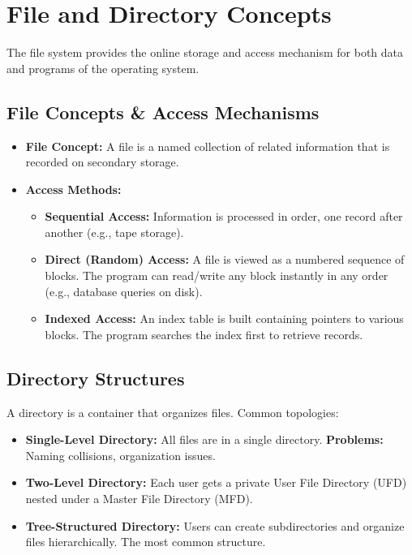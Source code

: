 \documentclass[12pt,a4paper]{article}
\begin{document}
\section{File and Directory Concepts}

The file system provides the online storage and access mechanism for both data and programs of the operating system.

\subsection{File Concepts \& Access Mechanisms}
\begin{itemize}[leftmargin=*, itemsep=3pt]
  \item \textbf{File Concept:} A file is a named collection of related information that is recorded on secondary storage.
  \item \textbf{Access Methods:}
  \begin{itemize}[leftmargin=*, itemsep=2.5pt, topsep=0pt]
    \item \textbf{Sequential Access:} Information is processed in order, one record after another (e.g., tape storage).
    \item \textbf{Direct (Random) Access:} A file is viewed as a numbered sequence of blocks. The program can read/write any block instantly in any order (e.g., database queries on disk).
    \item \textbf{Indexed Access:} An index table is built containing pointers to various blocks. The program searches the index first to retrieve records.
    \end{itemize}
  \end{itemize}

\subsection{Directory Structures}
A directory is a container that organizes files. Common topologies:
\begin{itemize}[leftmargin=*, itemsep=3pt]
  \item \textbf{Single-Level Directory:} All files are in a single directory. \textbf{Problems:} Naming collisions, organization issues.
  \item \textbf{Two-Level Directory:} Each user gets a private User File Directory (UFD) nested under a Master File Directory (MFD).
  \item \textbf{Tree-Structured Directory:} Users can create subdirectories and organize files hierarchically. The most common structure.
\end{itemize}
\end{document}

